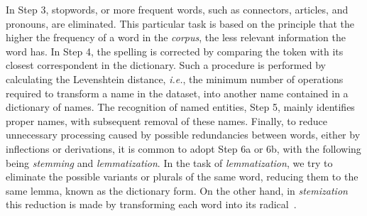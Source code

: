 \documentclass{ieeeaccess}
\begin{document}
In Step 3, stopwords, or more frequent words, such as connectors, articles, and pronouns, are eliminated. This particular task is based on the principle that the higher the frequency of a word in the \textit{corpus}, the less relevant information the word has. In Step 4, the spelling is corrected by comparing the token with its closest correspondent in the dictionary. Such a procedure is performed by calculating the Levenshtein distance, \textit{i.e.}, the minimum number of operations required to transform a name in the dataset, into another name contained in a dictionary of names. The recognition of named entities, Step 5, mainly identifies proper names, with subsequent removal of these names. Finally, to reduce unnecessary processing caused by possible redundancies between words, either by inflections or derivations, it is common to adopt Step 6a or 6b, with the following being \textit{stemming} and \textit{lemmatization}. In the task of \textit{lemmatization}, we try to eliminate the possible variants or plurals of the same word, reducing them to the same lemma, known as the dictionary form. On the other hand, in \textit{stemization} this reduction is made by transforming each word into its radical~\cite{icnc-2020-nicollas, navigli2009word, manning1999foundations}.

 
\end{document}
